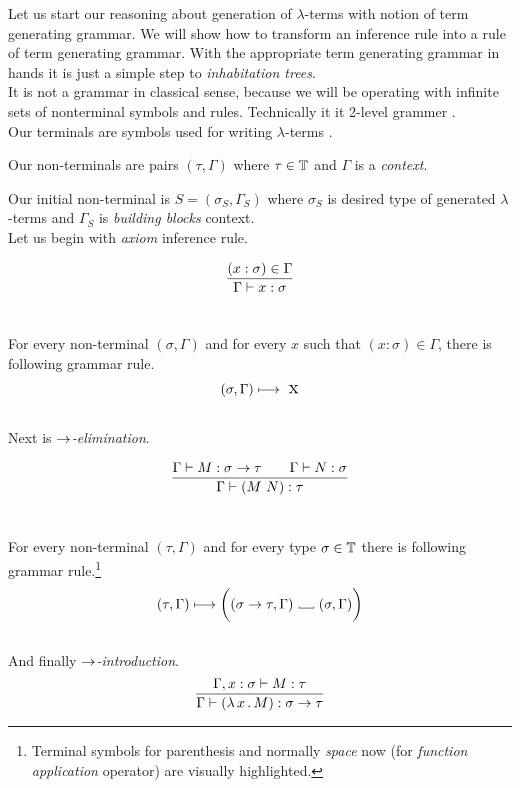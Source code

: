 \documentclass[12pt,a4paper]{report}
\newcommand{\Lets}{Let us\xspace}
\newcommand{\lterms}{$\lambda$-terms\xspace}
\newcommand{\tur}[3]{#1\vdash{}#2:#3}
\newcommand\Vtextvisiblespace[1][.3em]{%
  \mbox{\kern.06em\vrule height.3ex}%
  \vbox{\hrule width#1}%
  \hbox{\vrule height.3ex}}
\begin{document}
\Lets start our reasoning about generation of \lterms with
notion of term generating grammar. We will show how to
transform an inference rule into a rule of term generating grammar.
With the appropriate term generating grammar 
in hands it is just a simple step to \textit{inhabitation trees}.\\

It is not a grammar in classical sense, because we will be operating with infinite sets of nonterminal symbols and rules. Technically it it
2-level grammer \cite{todo}.\\

Our terminals are symbols used for writing \lterms 
.%

Our non-terminals are pairs $(\tau,\Gamma)$ where 
$\tau \in \mathbb{T}$ and $\Gamma$ is a \textit{context}.

Our initial non-terminal is $S = (\sigma_S,\Gamma_S)$
where $\sigma_S$ is desired type of generated \lterms and
$\Gamma_S$ is \textit{building blocks} context. \\

\Lets begin with \textit{axiom} inference rule.

$$
\ruleI { (x:\sigma) \in \Gamma }
       { \tur{\Gamma}{x}{\sigma} }
$$~


For every non-terminal $(\sigma,\Gamma)$ 
and for every $x$ such that $(x:\sigma) \in \Gamma$,
there is following grammar rule.
$$ ( \sigma , \Gamma )  \longmapsto \mbox{ {\Large x}} $$ \\

Next is \textit{$\rightarrow$-elimination}.

$$
\ruleII{ \tur{\Gamma}{M}{\sigma \ar \tau} }
       { \tur{\Gamma}{N}{\sigma} }
       { \tur{\Gamma}{(M~N)}{\tau} }
$$~

For every non-terminal $(\tau,\Gamma)$ 
and for every type $\sigma \in \mathbb{T}$ 
there is following grammar rule.\footnote{ 
Terminal symbols for parenthesis and normally {\it space} 
now \textvisiblespace \quad (for {\it function application} operator) 
are visually highlighted. } 
$$
	( \tau , \Gamma )  \gar
	\bigg( ( \sigma \rightarrow \tau , \Gamma ) 
	\mbox{ \Vtextvisiblespace[1em] } ( \sigma , \Gamma ) \bigg)
$$\\

And finally {\it $\rightarrow$-introduction}. 
$$
\ruleI { \tur{\Gamma,x:\sigma}{M}{\tau} }
       { \tur{\Gamma}{\lamb{x}{M}}{\sigma \ar \tau} }
$$
\end{document}

